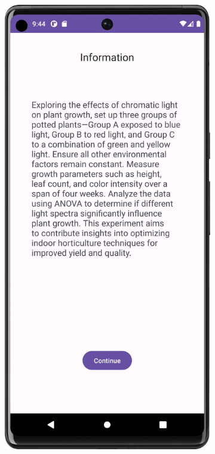 \begin{figure}[htbp]
    \centering
    \begin{subfigure}[b]{0.25\textwidth}
        \centering
        \includegraphics[width=\textwidth]{content/07_evaluation_of_the_solution/Screenshot_T10a.png}

\end{subfigure}
\end{figure}
